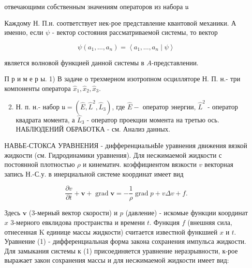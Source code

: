 \documentclass[10pt]{article}
\begin{document}
отвечающими собственным значениям операторов из набора $\mathfrak{u}$



Каждому Н. П.н. соответствует нек-рое представление квантовой механики. А именно, если $\psi$ - вектор состояния рассматриваемой системы, то вектор



\[

\psi\left(a_{1}, \ldots, a_{n}\right)=\left\langle a_{1}, \ldots, a_{n} \mid \psi\right\rangle

\]



является волновой функцией данной системы в $A$-представлении.



П р и м е р ы. 1) В задаче о трехмерном изотропном осцилляторе Н. П. н.- три компоненты оператора $\hat{x}_{1}, \hat{x}_{2}, \hat{x}_{3}$.



\begin{enumerate}

  \setcounter{enumi}{1}

  \item Н. п. н.- набор $\mathfrak{u}=\left(\hat{E}, \hat{L}^{2}, \hat{L}_{3}\right)$, где $\hat{E}-$ оператор энергии, $\hat{L}^{2}$ - оператор квадрата момента, а $\hat{L}_{3}$ - оператор проекции момента на третью ось. НАБЛЮДЕНИЙ ОБРАБОТКА - см. Анализ данных.

\end{enumerate}



НАВЬЕ-СТОКСА УРАВНЕНИЯ - дифференциальнЫе уравнения движения вязкой жидкости (см. Гидродинамики уравнения). Для несжимаемой жидкости с постоянной плотностью $\rho$ и кинематич. коэффициентом вязкости $v$ векторная запись Н.-С.у. в инерциальной системе координат имеет вид



\[

\frac{\partial v}{\partial t}+\boldsymbol{v}+\operatorname{grad} \boldsymbol{v}=-\frac{1}{\rho} \operatorname{grad} p+v \Delta v+f .

\]



Здесь $\boldsymbol{v}$ (3-мерный вектор скорости) и $p$ (давление) - искомые функции координат $x$ 3-мерного евклидова пространства и времени $t$. Функция $f$ (внешняя сила, отнесенная $\mathrm{K}$ единице массы жидкости) считается известной функшией $x$ и $t$. Уравнение (1) - дифференциальная форма закона сохранения импульса жидкости. Для замыкания системы к (1) присоединяется уравнение неразрывности, к-рое выражает закон сохранения массы и для несжимаемой жидкости имеет вид:
\end{document}
